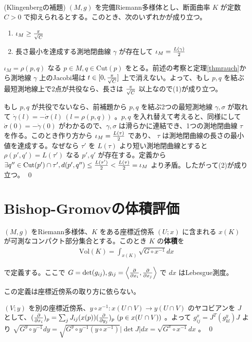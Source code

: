 \documentclass[dvipdfmx,a4paper]{jsreport}
\theoremstyle{definition}
\newcommand{\der}{\partial}
\begin{document}
\thm\label{thmklingenberg} (Klingenbergの補題) $(M,g)$ を完備Riemann多様体とし、断面曲率 $K$ が定数 $C>0$ で抑えられるとする。このとき、次のいずれかが成り立つ。
\begin{enumerate}
    \item $\iota_M \geq {\pi \over \sqrt{C}}$
    \item 長さ最小を達成する測地閉曲線 $\gamma$ が存在して $\iota_M={L(\gamma) \over 2}$
\end{enumerate}

\prf $\iota_M=\rho(p,q)$ なる $p \in M,q \in \mbox{Cut}(p)$ をとる。前述の考察と定理\ref{thmrauch}から測地線 $\gamma$ 上のJacobi場は $t \in [0,{\pi \over \sqrt{C}}]$ 上で消えない。よって、もし $p,q$ を結ぶ最短測地線上で2点が共役なら、長さは ${\pi \over \sqrt{C}}$ 以上なので(1)が成り立つ。

もし $p,q$ が共役でないなら、前補題から $p,q$ を結ぶ2つの最短測地線 $\gamma,\sigma$ が取れて $\dot{\gamma}(l)=-\dot{\sigma}(l)\ (l=\rho(p,q))$ 。$p,q$ を入れ替えて考えると、同様にして $\dot{\sigma}(0)=-\dot{\gamma}(0)$ がわかるので、$\gamma,\sigma$ は滑らかに連結でき、1つの測地閉曲線 $\tau$ を作る。このとき作り方から $\iota_M={L(\tau) \over 2}$ であり、 $\tau$ は測地閉曲線の長さの最小値を達成する。なぜなら $\tau'$ を $L(\tau)$ より短い測地閉曲線とすると $\rho(p',q')=L(\tau')$ なる $p',q'$ が存在する。定義から $\exists q'' \in \mbox{Cut}(p') \cap \tau',d(p',q'') \leq {L(\tau') \over 2}<{L(\tau) \over 2}=\iota_M$ より矛盾。したがって(2)が成り立つ。 \qed 

\section{Bishop-Gromovの体積評価}

 $(M,g)$ をRiemann多様体、$K$ をある座標近傍系 $(U;x)$ に含まれる $x(K)$ が可測なコンパクト部分集合とする。このとき $K$ の\textbf{体積}を
\begin{align*}
    \mbox{Vol}(K)=\int_{x(K)} \sqrt{G \circ x^{-1}}dx
\end{align*}

で定義する。ここで $G=\det(g_{ij}),g_{ij}=\ev{{\der \over \der x_i},{\der \over \der x_j}}$ で $dx$ はLebesgue測度。

\lem この定義は座標近傍系の取り方に依らない。

\prf $(V;y)$ を別の座標近傍系、$y\circ x^{-1}:x(U\cap V) \to y(U\cap V)$ のヤコビアンを $J$ として、$({\der \over \der x_i})_p=\sum_j J_{ij}(x(p))({\der \over \der y_j})_p \ (p \in x(U \cap V))$ 。よって $g_{ij}^x=J^T(g_{kl}^y)J$ より $\sqrt{G^y\circ y^{-1}} dy=\sqrt{G^y \circ y^{-1}(y \circ x^{-1})}|\det J|dx=\sqrt{G^x \circ x^{-1}}dx$ 。 \qed
\end{document}
